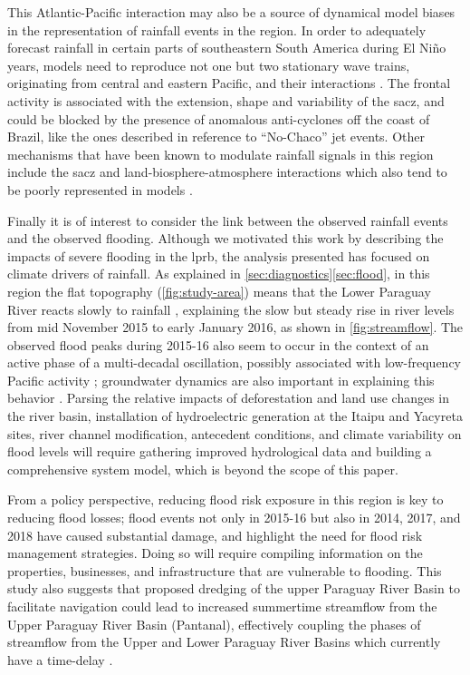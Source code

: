 \documentclass[twocol]{ametsoc}
\begin{document}
This Atlantic-Pacific interaction may also be a source of dynamical model biases in the representation of rainfall events in the region.
In order to adequately forecast rainfall in certain parts of southeastern South America during El Ni\~no years, models need to reproduce not one but two stationary wave trains, originating from central and eastern Pacific, and their interactions \citep{Barreiro2017}.
The frontal activity is associated with the extension, shape and variability of the \gls{sacz}, and could be blocked by the presence of anomalous anti-cyclones off the coast of Brazil, like the ones described in reference to ``No-Chaco'' jet events.
Other mechanisms that have been known to modulate rainfall signals in this region include the \gls{sacz} \citep{Carvalho2004,Munoz2015,Munoz2016} and land-biosphere-atmosphere interactions \citep{Grimm2000,Grimm2007} which also tend to be poorly represented in models \citep{Green2017,Koster2004}.

Finally it is of interest to consider the link between the observed rainfall events and the observed flooding.
Although we motivated this work by describing the impacts of severe flooding in the \gls{lprb}, the analysis presented has focused on climate drivers of rainfall.
As explained in \cref{sec:diagnostics}\ref{sec:flood}, in this region the flat topography (\cref{fig:study-area}) means that the Lower Paraguay River reacts slowly to rainfall \citep{Bravo2011,Barros2004}, explaining the slow but steady rise in river levels from mid November 2015 to early January 2016, as shown in \cref{fig:streamflow}.
The observed flood peaks during 2015-16 also seem to occur in the context of an active phase of a multi-decadal oscillation, possibly associated with low-frequency Pacific activity \citep{Collischonn2001,Huang2005}; groundwater dynamics are also important in explaining this behavior \citep{Santos2016}.
Parsing the relative impacts of deforestation and land use changes in the river basin, installation of hydroelectric generation at the Itaipu and Yacyreta sites, river channel modification, antecedent conditions, and climate variability on flood levels will require gathering improved hydrological data and building a comprehensive system model, which is beyond the scope of this paper.

From a policy perspective, reducing flood risk exposure in this region is key to reducing flood losses; flood events not only in 2015-16 but also in 2014, 2017, and 2018 have caused substantial damage, and highlight the need for flood risk management strategies.
Doing so will require compiling information on the properties, businesses, and infrastructure that are vulnerable to flooding.
This study also suggests that proposed dredging of the upper Paraguay River Basin to facilitate navigation could lead to increased summertime streamflow from the Upper Paraguay River Basin (Pantanal), effectively coupling the phases of streamflow from the Upper and Lower Paraguay River Basins which currently have a time-delay \citep{Bravo2011}.
\end{document}
